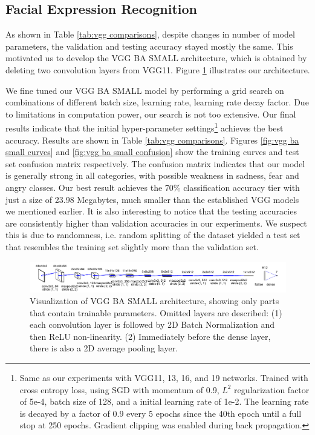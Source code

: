 \documentclass{article}
\begin{document}
\subsection{Facial Expression Recognition}
As shown in Table \ref{tab:vgg comparisons}, despite changes in number of model parameters, the validation and testing accuracy stayed mostly the same. This motivated us to develop the VGG BA SMALL architecture, which is obtained by deleting two convolution layers from VGG11. Figure \ref{fig:architecture vgg ba small} illustrates our architecture. 

We fine tuned our VGG BA SMALL model by performing a grid search on combinations of different batch size, learning rate, learning rate decay factor. Due to limitations in computation power, our search is not too extensive. Our final results indicate that the initial hyper-parameter settings\footnote{Same as our experiments with VGG11, 13, 16, and 19 networks. Trained with cross entropy loss, using SGD with momentum of 0.9, $L^2$ regularization factor of 5e-4, batch size of 128, and a initial learning rate of 1e-2. The learning rate is decayed by a factor of 0.9 every 5 epochs since the 40th epoch until a full stop at 250 epochs. Gradient clipping was enabled during back propagation.} achieves the best accuracy. Results are shown in Table \ref{tab:vgg comparisons}. Figures \ref{fig:vgg ba small curves} and \ref{fig:vgg ba small confusion} show the training curves and test set confusion matrix respectively. The confusion matrix indicates that our model is generally strong in all categories, with possible weakness in sadness, fear and angry classes. Our best result achieves the 70\% classification accuracy tier with just a size of 23.98 Megabytes, much smaller than the established VGG models we mentioned earlier. It is also interesting to notice that the testing accuracies are consistently higher than validation accuracies in our experiments. We suspect this is due to randomness, i.e. random splitting of the dataset yielded a test set that resembles the training set slightly more than the validation set.
\begin{figure}[]
    \centering
    \includegraphics[width=\textwidth]{figs/VGG_BA_SMALL.pdf}
    \caption{Visualization of VGG BA SMALL architecture, showing only parts that contain trainable parameters. Omitted layers are described: (1) each convolution layer is followed by 2D Batch Normalization and then ReLU non-linearity. (2) Immediately before the dense layer, there is also a 2D average pooling layer. }
    \label{fig:architecture vgg ba small}
\end{figure}
\end{document}

